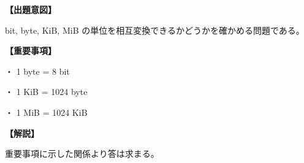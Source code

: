 \noindent \textbf{【出題意図】}

\noindent bit, byte, KiB, MiB の単位を相互変換できるかどうかを確かめる問題である。

\vspace{1em}
\noindent \textbf{【重要事項】}

\medskip
\noindent ・ 1 byte = 8 bit

\medskip
\noindent ・ 1 KiB = 1024 byte

\medskip
\noindent ・ 1 MiB = 1024 KiB

\vspace{1em}
\noindent \textbf{【解説】}

\noindent 重要事項に示した関係より答は求まる。
